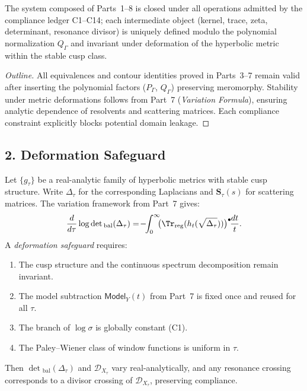 \begin{theorem*}\relax\hspace{0pt}
\label{thm:tfc8-closure}\relax\hspace{0pt}
The system composed of Parts~1–8 is closed under all operations admitted by the compliance ledger C1–C14; each intermediate object (kernel, trace, zeta, determinant, resonance divisor) is uniquely defined modulo the polynomial normalization $Q_\Gamma$ and invariant under deformation of the hyperbolic metric within the stable cusp class.\relax\hspace{0pt}
\end{theorem*}

\begin{proof}[Outline]\relax\hspace{0pt}
All equivalences and contour identities proved in Parts~3–7 remain valid after inserting the polynomial factors ($P_\Gamma$, $Q_\Gamma$) preserving meromorphy.  
Stability under metric deformations follows from Part~7 (\emph{Variation Formula}), ensuring analytic dependence of resolvents and scattering matrices.  
Each compliance constraint explicitly blocks potential domain leakage.\relax\hspace{0pt}
\end{proof}

\subsection*{2. Deformation Safeguard}\relax\hspace{0pt}
\label{subsec:tfc8-deformation} %

Let $\{g_\tau\}$ be a real-analytic family of hyperbolic metrics with stable cusp structure.  
Write $\Delta_\tau$ for the corresponding Laplacians and $\mathbf{S}_\tau(s)$ for scattering matrices.  
The variation framework from Part~7 gives:
\[
\frac{d}{d\tau}\log\det{}_{\mathrm{bal}}(\Delta_\tau)
=\!-\!\!\int_0^\infty\!\!\!\big(\Tr_{\mathrm{reg}}(h_t(\sqrt{\Delta_\tau}))\big)^{\bullet}\!\frac{dt}{t}.
\]
A \emph{deformation safeguard} requires:
\begin{enumerate}[label=(\roman*)]
\item The cusp structure and the continuous spectrum decomposition remain invariant.
\item The model subtraction $\mathsf{Model}_Y(t)$ from Part~7 is fixed once and reused for all $\tau$.
\item The branch of $\log\sigma$ is globally constant (C1).
\item The Paley–Wiener class of window functions is uniform in $\tau$.
\end{enumerate}
Then $\det{}_{\mathrm{bal}}(\Delta_\tau)$ and $\mathscr{D}_{X_\tau}$ vary real-analytically, and any resonance crossing corresponds to a divisor crossing of $\mathscr{D}_{X_\tau}$, preserving compliance.\relax\hspace{0pt}

